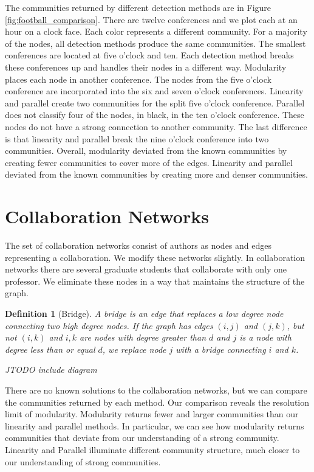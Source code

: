 \documentclass[phd,tocprelim]{cornell}
\newtheorem{definition}{Definition}
\begin{document}
The communities returned by different detection methods are in Figure \ref{fig:football_comparison}.  There are twelve conferences and we plot each at an hour on a clock face.  Each color represents a different community.  For a majority of the nodes, all detection methods produce the same communities.  The smallest conferences are located at five o'clock and ten.  Each detection method breaks these conferences up and handles their nodes in a different way.  Modularity places each node in another conference.  The nodes from the five o'clock conference are incorporated into the six and seven o'clock conferences.  Linearity and parallel create two communities for the split five o'clock conference.  Parallel does not classify four of the nodes, in black, in the ten o'clock conference.  These nodes do not have a strong connection to another community.  The last difference is that linearity and parallel break the nine o'clock conference into two communities.  Overall, modularity deviated from the known communities by creating fewer communities to cover more of the edges.  Linearity and parallel deviated from the known communities by creating more and denser communities.



\section{Collaboration Networks}

The set of collaboration networks consist of authors as nodes and edges representing a collaboration.  We modify these networks slightly.  In collaboration networks there are several graduate students that collaborate with only one professor.  We eliminate these nodes in a way that maintains the structure of the graph.

\begin{definition}[Bridge]
A bridge is an edge that replaces a low degree node connecting two high degree nodes.  If the graph has edges $(i, j)$ and $(j, k)$, but not $(i, k)$ and $i,k$ are nodes with degree greater than $d$ and $j$ is a node with degree less than or equal $d$, we replace node $j$ with a bridge connecting $i$ and $k$.

JTODO include diagram
\end{definition}

There are no known solutions to the collaboration networks, but we can compare the communities returned by each method.  Our comparison reveals the resolution limit of modularity.  Modularity returns fewer and larger communities than our linearity and parallel methods.  In particular, we can see how modularity returns communities that deviate from our understanding of a strong community.  Linearity and Parallel illuminate different community structure, much closer to our understanding of strong communities.
\end{document}
